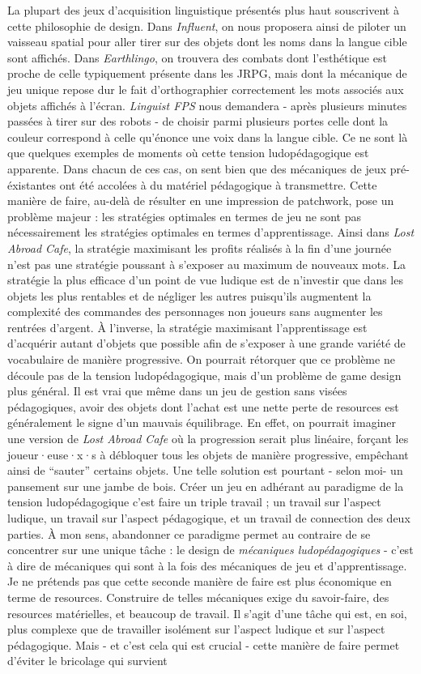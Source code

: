 \documentclass{scrartcl}
\begin{document}
		La plupart des jeux d'acquisition linguistique présentés plus haut souscrivent à cette philosophie de design. Dans \textit{Influent}, on nous proposera ainsi de piloter un vaisseau spatial pour aller tirer sur des objets dont les noms dans la langue cible sont affichés. Dans \textit{Earthlingo}, on trouvera des combats dont l’esthétique est proche de celle typiquement présente dans les JRPG, mais dont la mécanique de jeu unique repose dur le fait d’orthographier correctement les mots associés aux objets affichés à l’écran. \textit{Linguist FPS} nous demandera - après plusieurs minutes passées à tirer sur des robots - de choisir parmi plusieurs portes celle dont la couleur correspond à celle qu'énonce une voix dans la langue cible. Ce ne sont là que quelques exemples de moments où cette tension ludopédagogique est apparente. Dans chacun de ces cas, on sent bien que des mécaniques de jeux pré-éxistantes ont été accolées à du matériel pédagogique à transmettre. Cette manière de faire, au-delà de résulter en une impression de patchwork, pose un problème majeur : les stratégies optimales en termes de jeu ne sont pas nécessairement les stratégies optimales en termes d'apprentissage. Ainsi dans \textit{Lost Abroad Cafe}, la stratégie maximisant les profits réalisés à la fin d’une journée n’est pas une stratégie poussant à s’exposer au maximum de nouveaux mots. La stratégie la plus efficace d’un point de vue ludique est de n’investir que dans les objets les plus rentables et de négliger les autres puisqu’ils augmentent la complexité des commandes des personnages non joueurs sans augmenter les rentrées d’argent. À l’inverse, la stratégie maximisant l’apprentissage est d’acquérir autant d’objets que possible afin de s’exposer à une grande variété de vocabulaire de manière progressive. On pourrait rétorquer que ce problème ne découle pas de la tension ludopédagogique, mais d’un problème de game design plus général. Il est vrai que même dans un jeu de gestion sans visées pédagogiques, avoir des objets dont l’achat est une nette perte de resources est généralement le signe d’un mauvais équilibrage. En effet, on pourrait imaginer une version de \textit{Lost Abroad Cafe} où la progression serait plus linéaire, forçant les joueur·euse·x·s à débloquer tous les objets de manière progressive, empêchant ainsi de “sauter” certains objets. Une telle solution est pourtant - selon moi- un pansement sur une jambe de bois. Créer un jeu en adhérant au paradigme de la tension ludopédagogique c'est faire un triple travail ; un travail sur l'aspect ludique, un travail sur l'aspect pédagogique, et un travail de connection des deux parties. À mon sens, abandonner ce paradigme permet au contraire de se concentrer sur une unique tâche : le design de \textit{mécaniques ludopédagogiques} - c'est à dire de mécaniques qui sont à la fois des mécaniques de jeu et d'apprentissage. Je ne prétends pas que cette seconde manière de faire est plus économique en terme de resources. Construire de telles mécaniques exige du savoir-faire, des resources matérielles, et beaucoup de travail. Il s'agit d'une tâche qui est, en soi, plus complexe que de travailler isolément sur l'aspect ludique et sur l'aspect pédagogique. Mais - et c'est cela qui est crucial - cette manière de faire permet d'éviter le bricolage qui survient 
\end{document}
